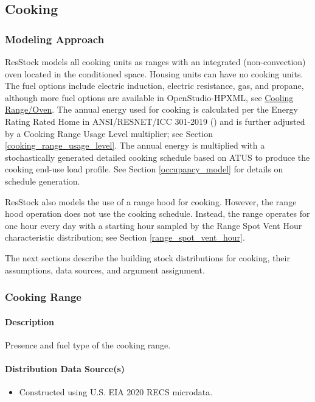 \subsection{Cooking}
\subsubsection{Modeling Approach}
ResStock models all cooking units as ranges with an integrated (non-convection) oven located in the conditioned space. Housing units can have no cooking units. The fuel options include electric induction, electric resistance, gas, and propane, although more fuel options are available in OpenStudio-HPXML, see \href{https://openstudio-hpxml.readthedocs.io/en/v1.8.1/workflow_inputs.html#hpxml-cooking-range-oven}{Cooling Range/Oven}. The annual energy used for cooking is calculated per the Energy Rating Rated Home in ANSI/RESNET/ICC 301-2019 (\cite{ansi_resnet_301_2019}) and is further adjusted by a Cooking Range Usage Level multiplier; see Section \ref{cooking_range_usage_level}. The annual energy is multiplied with a stochastically generated detailed cooking schedule based on ATUS to produce the cooking end-use load profile. See Section \ref{occupancy_model} for details on schedule generation.

ResStock also models the use of a range hood for cooking. However, the range hood operation does not use the cooking schedule. Instead, the range operates for one hour every day with a starting hour sampled by the Range Spot Vent Hour characteristic distribution; see Section \ref{range_spot_vent_hour}.

The next sections describe the building stock distributions for cooking, their assumptions, data sources, and argument assignment.

\subsubsection{Cooking Range}
\paragraph{Description}
Presence and fuel type of the cooking range.

\paragraph{Distribution Data Source(s)}
\begin{itemize}
\item 


Constructed using U.S. EIA 2020 RECS microdata. 
\end{itemize}
